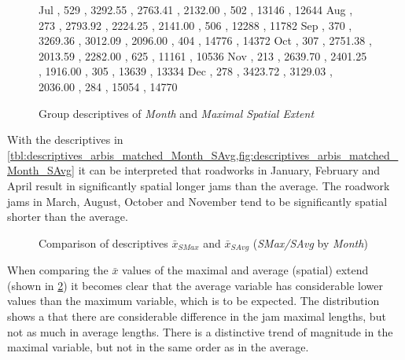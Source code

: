 \begin{figure}[ht!]
\begin{minipage}{0.55\textwidth}
{			Jul , 529 , 3292.55 , 2763.41 , 2132.00 , 502 , 13146 , 12644
			Aug , 273 , 2793.92 , 2224.25 , 2141.00 , 506 , 12288 , 11782
			Sep , 370 , 3269.36 , 3012.09 , 2096.00 , 404 , 14776 , 14372
			Oct , 307 , 2751.38 , 2013.59 , 2282.00 , 625 , 11161 , 10536
			Nov , 213 , 2639.70 , 2401.25 , 1916.00 , 305 , 13639 , 13334
			Dec , 278 , 3423.72 , 3129.03 , 2036.00 , 284 , 15054 , 14770
		}\data		
		\pgfplotstablesort[sort key=mean, sort cmp=float >]{\datasorted}{\data}
		\tiny
		\centering
		\label{fig:descriptives_arbis_matched_Month_SAvg}
	\end{minipage}%
	\caption{Group descriptives of \textit{Month} and \textit{Maximal Spatial Extent}}
\end{figure}
With the descriptives in \cref{tbl:descriptives_arbis_matched_Month_SAvg,fig:descriptives_arbis_matched_Month_SAvg} it can be interpreted that roadworks in January, February and April result in significantly spatial longer jams than the average. The roadwork jams in March, August, October and November tend to be significantly spatial shorter than the average.
\begin{figure}[ht!]
	\data
	\pgfplotstablesort[sort key=meanSAvg, sort cmp=float >]{\datasorted}{\data}
	\tiny
	\centering
	\caption{Comparison of descriptives $\bar{x}_{SMax}$ and $\bar{x}_{SAvg}$ (\textit{SMax/SAvg} by \textit{Month})}
	\label{fig:arbis_matched_meancomparison_month_spatial}
\end{figure}
When comparing the $\bar{x}$ values of the maximal and average (spatial) extend (shown in \cref{fig:arbis_matched_meancomparison_month_spatial}) it becomes clear that the average variable has considerable lower values than the maximum variable, which is to be expected. The distribution shows a that there are considerable difference in the jam maximal lengths, but not as much in average lengths. There is a distinctive trend of magnitude in the maximal variable, but not in the same order as in the average. 

